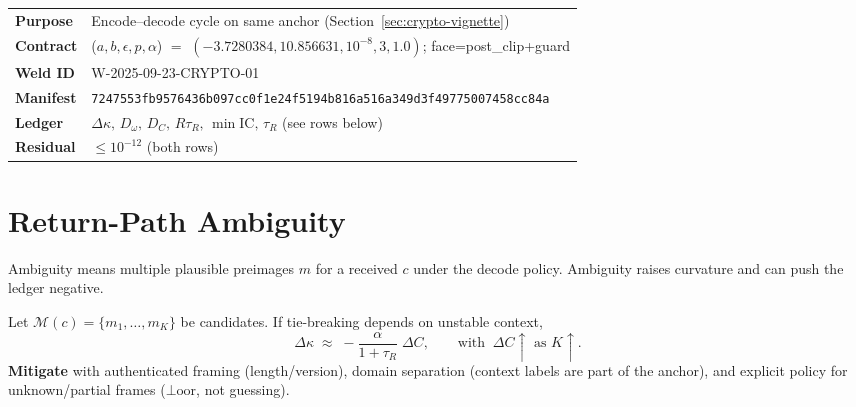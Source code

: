 \begin{eqbox}
\small

\begingroup
\def\UrlBreaks{\do\0\do\1\do\2\do\3\do\4\do\5\do\6\do\7\do\8\do\9%
  \do\a\do\b\do\c\do\d\do\e\do\f\do\A\do\B\do\C\do\D\do\E\do\F}
\def\UrlFont{\ttfamily\small}
\setlength{\tabcolsep}{6pt}

\begin{tabularx}{\linewidth}{@{} >{\bfseries}l >{\ttfamily\small\raggedright\arraybackslash}X @{}}
Purpose   & Encode–decode cycle on same anchor (Section~\ref{sec:crypto-vignette}) \\
Contract  & (\(a,b,\epsilon,p,\alpha\)) \(=\) \((-3.7280384, 10.856631, 10^{-8}, 3, 1.0)\); face=post\_clip+guard \\
Weld ID   & W-2025-09-23-CRYPTO-01 \\
Manifest  & \nolinkurl{7247553fb9576436b097cc0f1e24f5194b816a516a349d3f49775007458cc84a} \\
Ledger    & \(\Delta\kappa,\,D_{\omega},\,D_{C},\,R\tau_{R},\,\min\mathrm{IC},\,\tau_{R}\) (see rows below) \\
Residual  & \(\le 10^{-12}\) (both rows) \\
\end{tabularx}
\endgroup

\end{eqbox}



\section{Return-Path Ambiguity}
\label{sec:crypto-ambiguity}

Ambiguity means multiple plausible preimages \(m\) for a received \(c\) under the decode policy. Ambiguity raises curvature and can push the ledger negative.

\begin{eqbox}
Let \(\mathcal{M}(c)=\{m_1,\dots,m_K\}\) be candidates. If tie-breaking depends on unstable context,
\[
\Delta\kappa \;\approx\; -\frac{\alpha}{1+\tau_{R}}\;\Delta C,
\qquad \text{with }\ \Delta C \uparrow\text{ as }K\uparrow.
\]
\textbf{Mitigate} with authenticated framing (length/version), domain separation (context labels are part of the anchor), and explicit policy for unknown/partial frames (\(\bot\!\mathrm{oor}\), not guessing).
\end{eqbox}

